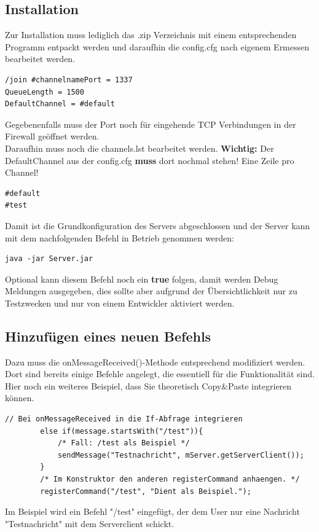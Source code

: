 \documentclass[a4paper,12pt]{scrartcl}
\begin{document}
\subsection{Installation}
Zur Installation muss lediglich das .zip Verzeichnis mit einem entsprechenden Programm entpackt werden und daraufhin die config.cfg nach eigenem Ermessen bearbeitet werden.
\begin{lstlisting}[frame=single,caption=Beispielinhalt der Konfigurationsdatei]
/join #channelnamePort = 1337
QueueLength = 1500
DefaultChannel = #default
\end{lstlisting}
Gegebenenfalls muss der Port noch für eingehende TCP Verbindungen in der Firewall geöffnet werden.\\
Daraufhin muss noch die channels.lst bearbeitet werden. \textbf{Wichtig:} Der DefaultChannel aus der config.cfg \textbf{muss} dort nochmal stehen! Eine Zeile pro Channel!
\begin{lstlisting}[frame=single,caption=Beispielinhalt der Channeldatei]
#default
#test
\end{lstlisting}

Damit ist die Grundkonfiguration des Servers abgeschlossen und der Server kann mit dem nachfolgenden Befehl in Betrieb genommen werden:
\begin{lstlisting}[frame=single,caption=Startbefehl]
java -jar Server.jar
\end{lstlisting}
Optional kann diesem Befehl noch ein \textbf{true} folgen, damit werden Debug Meldungen ausgegeben, dies sollte aber aufgrund der Übersichtlichkeit nur zu Testzwecken und nur von einem Entwickler aktiviert werden.

\subsection{Hinzufügen eines neuen Befehls}
Dazu muss die onMessageReceived()-Methode entsprechend modifiziert werden. Dort sind bereits einige Befehle angelegt, die essentiell für die Funktionalität sind.\\

Hier noch ein weiteres Beispiel, dass Sie theoretisch Copy\&Paste integrieren können.
\begin{lstlisting}[frame=single,caption=Beispielinhalt der Channeldatei]
		// Bei onMessageReceived in die If-Abfrage integrieren
 		else if(message.startsWith("/test")){
			/* Fall: /test als Beispiel */
			sendMessage("Testnachricht", mServer.getServerClient());			
		}
		/* Im Konstruktor den anderen registerCommand anhaengen. */
		registerCommand("/test", "Dient als Beispiel."); 
\end{lstlisting}
Im Beispiel wird ein Befehl "/test" {eingefügt}, der dem User nur eine Nachricht "Testnachricht" mit dem Serverclient schickt.
\clearpage
\end{document}
